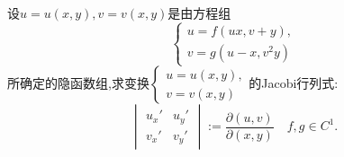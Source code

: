 \begin{example}
    设$u = u(x,y) , v=v(x,y)$是由方程组
    $$
    \begin{cases}
        u = f(ux,v+y),\\
        v = g(u-x,v^2y)
    \end{cases}
    $$所确定的隐函数组,求变换$\begin{cases}
        u = u(x,y),\\
        v = v(x,y)
    \end{cases}$的Jacobi行列式:
    $$
    \begin{vmatrix}
        u_x' & u_y'\\
        v_x' & v_y'
    \end{vmatrix} := \frac{\partial(u,v)}{\partial(x,y)}  \quad f,g \in C^1.
    $$
\end{example}

